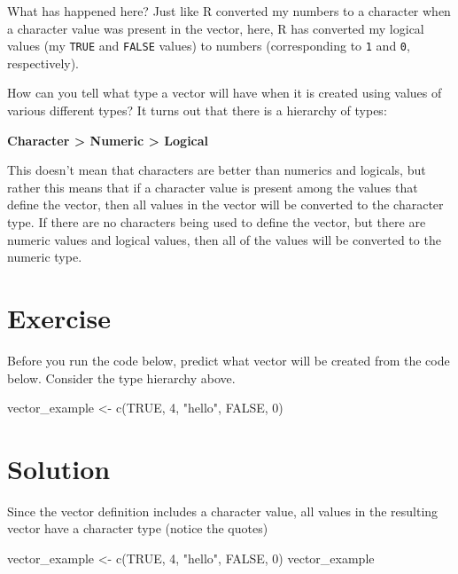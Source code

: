 \documentclass[
  letterpaper,
  DIV=11,
  numbers=noendperiod]{scrreprt}
\newenvironment{Shaded}{\begin{snugshade}}{\end{snugshade}}
\newcommand{\ConstantTok}[1]{\textcolor[rgb]{0.56,0.35,0.01}{#1}}
\newcommand{\DecValTok}[1]{\textcolor[rgb]{0.68,0.00,0.00}{#1}}
\newcommand{\FunctionTok}[1]{\textcolor[rgb]{0.28,0.35,0.67}{#1}}
\newcommand{\NormalTok}[1]{\textcolor[rgb]{0.00,0.23,0.31}{#1}}
\newcommand{\OtherTok}[1]{\textcolor[rgb]{0.00,0.23,0.31}{#1}}
\newcommand{\StringTok}[1]{\textcolor[rgb]{0.13,0.47,0.30}{#1}}
\begin{document}
What has happened here? Just like R converted my numbers to a character
when a character value was present in the vector, here, R has converted
my logical values (my \texttt{TRUE} and \texttt{FALSE} values) to
numbers (corresponding to \texttt{1} and \texttt{0}, respectively).

How can you tell what type a vector will have when it is created using
values of various different types? It turns out that there is a
hierarchy of types:

\textbf{Character \textgreater{} Numeric \textgreater{} Logical}

This doesn't mean that characters are better than numerics and logicals,
but rather this means that if a character value is present among the
values that define the vector, then all values in the vector will be
converted to the character type. If there are no characters being used
to define the vector, but there are numeric values and logical values,
then all of the values will be converted to the numeric type.

\section{Exercise}

Before you run the code below, predict what vector will be created from
the code below. Consider the type hierarchy above.

\begin{Shaded}
\begin{Highlighting}[]
\NormalTok{vector\_example }\OtherTok{\textless{}{-}} \FunctionTok{c}\NormalTok{(}\ConstantTok{TRUE}\NormalTok{, }\DecValTok{4}\NormalTok{, }\StringTok{"hello"}\NormalTok{, }\ConstantTok{FALSE}\NormalTok{, }\DecValTok{0}\NormalTok{)}
\end{Highlighting}
\end{Shaded}

\section{Solution}

Since the vector definition includes a character value, all values in
the resulting vector have a character type (notice the quotes)

\begin{Shaded}
\begin{Highlighting}[]
\NormalTok{vector\_example }\OtherTok{\textless{}{-}} \FunctionTok{c}\NormalTok{(}\ConstantTok{TRUE}\NormalTok{, }\DecValTok{4}\NormalTok{, }\StringTok{"hello"}\NormalTok{, }\ConstantTok{FALSE}\NormalTok{, }\DecValTok{0}\NormalTok{)}
\NormalTok{vector\_example}
\end{Highlighting}
\end{Shaded}
\end{document}

